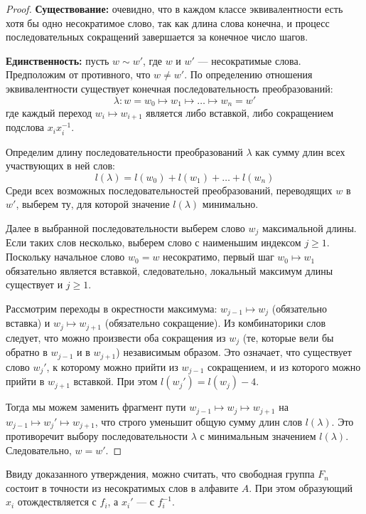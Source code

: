 \begin{proof}
	\textbf{Существование:} очевидно, что в каждом классе эквивалентности есть хотя бы одно несократимое слово, так как длина слова конечна, и процесс последовательных сокращений завершается за конечное число шагов.
	
	\textbf{Единственность:} пусть $w \sim w'$, где $w$ и $w'$ — несократимые слова. Предположим от противного, что $w \neq w'$.
	По определению отношения эквивалентности существует конечная последовательность преобразований:
	\[ \lambda: w = w_0 \mapsto w_1 \mapsto \dots \mapsto w_n = w' \]
	где каждый переход $w_i \mapsto w_{i+1}$ является либо вставкой, либо сокращением подслова $x_i x_i^{-1}$.
	
	Определим длину последовательности преобразований $\lambda$ как сумму длин всех участвующих в ней слов:
	\[ l(\lambda) = l(w_0) + l(w_1) + \dots + l(w_n) \]
	Среди всех возможных последовательностей преобразований, переводящих $w$ в $w'$, выберем ту, для которой значение $l(\lambda)$ минимально.
	
	Далее в выбранной последовательности выберем слово $w_j$ максимальной длины. Если таких слов несколько, выберем слово с наименьшим индексом $j \ge 1$. Поскольку начальное слово $w_0 = w$ несократимо, первый шаг $w_0 \mapsto w_1$ обязательно является вставкой, следовательно, локальный максимум длины существует и $j \ge 1$.
	
	Рассмотрим переходы в окрестности максимума: $w_{j-1} \mapsto w_j$ (обязательно вставка) и $w_j \mapsto w_{j+1}$ (обязательно сокращение). Из комбинаторики слов следует, что можно произвести оба сокращения из $w_j$ (те, которые вели бы обратно в $w_{j-1}$ и в $w_{j+1}$) независимым образом. Это означает, что существует слово $w_j'$, к которому можно прийти из $w_{j-1}$ сокращением, и из которого можно прийти в $w_{j+1}$ вставкой. При этом $l(w_j') = l(w_j) - 4$.
	
	Тогда мы можем заменить фрагмент пути $w_{j-1} \mapsto w_j \mapsto w_{j+1}$ на $w_{j-1} \mapsto w_j' \mapsto w_{j+1}$, что строго уменьшит общую сумму длин слов $l(\lambda)$. Это противоречит выбору последовательности $\lambda$ с минимальным значением $l(\lambda)$. Следовательно, $w = w'$.
\end{proof}

\begin{Remark}{}{}
	Ввиду доказанного утверждения, можно считать, что свободная группа $F_n$ состоит в точности из несократимых слов в алфавите $A$. При этом образующий $x_i$ отождествляется с $f_i$, а $x_i'$ — с $f_i^{-1}$.
\end{Remark}

